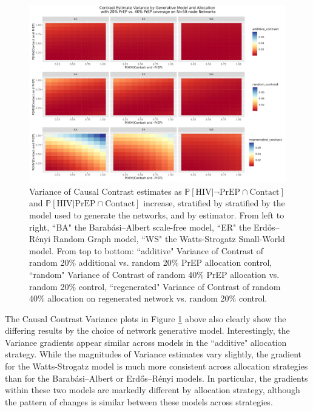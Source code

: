 \documentclass{article}
\theoremstyle{definition}
\begin{document}
\begin{figure}[H]
    \centering
    \includegraphics[width=\linewidth]{Corrected Figures/Generative Model Variance Plot.png}
    \caption{Variance of Causal Contrast estimates as $\mathbb{P}\left[\text{HIV} \vert \neg \text{PrEP} \cap \text{Contact}\right]$ and $\mathbb{P}\left[\text{HIV} \vert \text{PrEP} \cap \text{Contact}\right]$ increase, stratified by stratified by the model used to generate the networks, and by estimator. From left to right, ``BA" the Barabási–Albert scale-free model, ``ER" the Erdős–Rényi Random Graph model, ``WS" the Watts-Strogatz Small-World model. From top to bottom: ``additive" Variance of Contrast of random 20\% additional vs. random 20\% PrEP allocation control, ``random" Variance of Contrast of random 40\% PrEP allocation vs. random 20\% control, ``regenerated" Variance of Contrast of random 40\% allocation on regenerated network vs. random 20\% control.}
    \label{fig:Figure S4.18}
\end{figure}
The Causal Contrast Variance plots in Figure \ref{fig:Figure S4.18} above also clearly show the differing results by the choice of network generative model.  Interestingly, the Variance gradients appear similar across models in the ``additive" allocation strategy. While the magnitudes of Variance estimates vary slightly, the gradient for the Watts-Strogatz model is much more consistent  across allocation strategies than for the Barabási–Albert or  Erdős–Rényi models. In particular, the gradients within these two models are markedly different by allocation strategy, although the pattern of changes is similar between these models across strategies. 
\end{document}
